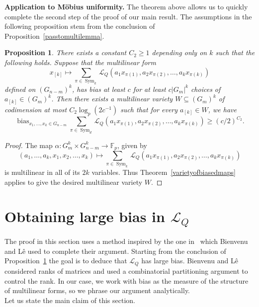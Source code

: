 \documentclass[a4paper,11pt]{article}
\newtheorem{proposition}[theorem]{Proposition}
\theoremstyle{definition}
\newcommand{\on}[1]{
	\operatorname{#1}
}
\begin{document}
\textbf{Application to M\"obius uniformity.} The theorem above allows us to quickly complete the second step of the proof of our main result. The assumptions in the following proposition stem from the conclusion of Proposition~\ref{passtomultilemma}.

\begin{proposition}\label{mobiuscorrvariety}
    There exists a constant $C_{2} \geq 1$ depending only on $k$ such that the following holds. Suppose that the multilinear form
    \[x_{[k]} \mapsto \sum_{\pi \in \on{Sym}_k} \mathcal{L}_Q(a_1x_{\pi(1)}, a_2 x_{\pi(2)},\dots, a_k x_{\pi(k)})\]
    defined on $(G_{n - m})^k$, has bias at least $c$ for at least $c |G_{m}|^k$ choices of $a_{[k]} \in (G_{m})^k$. Then there exists a multilinear variety $W \subseteq (G_{m})^k$ of codimension at most $C_{2} \log_p(2c^{-1})$ such that for every $a_{[k]} \in W$, we have
    \[\on{bias}_{x_1, \dots, x_k \in G_{n-m}} \sum_{\pi \in \on{Sym}_d}  \mathcal{L}_Q(a_1x_{\pi(1)}, a_2 x_{\pi(2)},\dots, a_k x_{\pi(k)}) \geq (c/2)^{C_{2}}.\]
\end{proposition}

\begin{proof}
    The map $\alpha: G_{m}^k\times G_{n-m}^k \to \mathbb{F}_p$, given by
    \[(a_1, \dots, a_k, x_1, x_2,\dots, x_k) \mapsto \sum_{\pi \in \on{Sym}_k}  \mathcal{L}_Q(a_1x_{\pi(1)}, a_2 x_{\pi(2)},\dots, a_k x_{\pi(k)})\]
    is multilinear in all of its $2k$ variables. Thus Theorem~\ref{varietyofbiasedmaps} applies to give the desired multilinear variety $W$.
\end{proof}



\section{Obtaining large bias in $\mathcal{L}_Q$}\label{LQhighbias}

The proof in this section uses a method inspired by the one in~\cite{BL} which Bienvenu and L\^{e} used to complete their argument. Starting from the conclusion of Proposition~\ref{mobiuscorrvariety} the goal is to deduce that $\mathcal{L}_Q$ has large bias. Bienvenu and L\^{e} considered ranks of matrices and used a combinatorial partitioning argument to control the rank. In our case, we work with bias as the measure of the structure of multilinear forms, so we phrase our argument analytically.\\

Let us state the main claim of this section.
\end{document}
